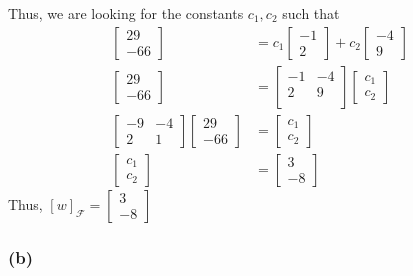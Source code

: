 \documentclass{article}
\begin{document}
Thus, we are looking for the constants \(c_1,c_2\) such that
\begin{align*}
    \begin{bmatrix}
        29 \\ -66
    \end{bmatrix} &= c_1\begin{bmatrix}
        -1 \\ 2
    \end{bmatrix} + c_2 \begin{bmatrix}
        -4 \\ 9
    \end{bmatrix} \\
    \begin{bmatrix}
        29 \\ -66
    \end{bmatrix} &= \begin{bmatrix}
        -1 & -4 \\
        2 & 9 \\
    \end{bmatrix} \begin{bmatrix}
        c_1 \\ c_2
    \end{bmatrix} \\
    \begin{bmatrix}
        -9 & -4 \\
        2 & 1
    \end{bmatrix} \begin{bmatrix}
        29 \\ -66
    \end{bmatrix} &= \begin{bmatrix}
        c_1 \\ c_2
    \end{bmatrix} \\
    \begin{bmatrix}
        c_1 \\ c_2
    \end{bmatrix} &= \begin{bmatrix}
        3 \\-8
    \end{bmatrix}
\end{align*}
Thus, \([w]_\mathcal{F} = \begin{bmatrix}
    3 \\ -8
\end{bmatrix}\)


\subsubsection*{(b)}
\end{document}
